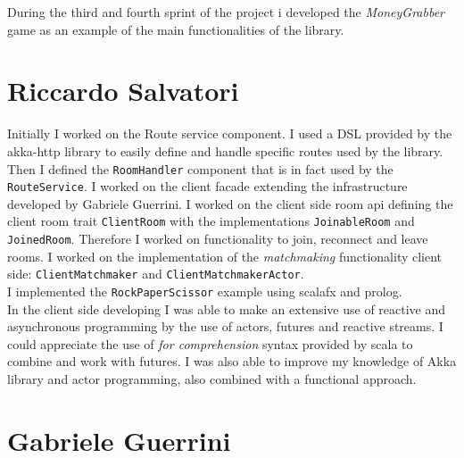 During the third and fourth sprint of the project i developed the \textit{MoneyGrabber} game as an example of the main functionalities of the library. 



\section{Riccardo Salvatori}
Initially I worked on the Route service component. I used a DSL provided by the akka-http library to easily define and handle specific routes used by the library. Then I defined the \texttt{RoomHandler} component that is in fact used by the \texttt{RouteService}.
I worked on the client facade extending the infrastructure developed by Gabriele Guerrini. I worked on the client side room api defining the client room trait \texttt{ClientRoom} with the implementations \texttt{JoinableRoom} and \texttt{JoinedRoom}. Therefore I worked on functionality to join, reconnect and leave rooms.
I worked on the implementation of the \textit{matchmaking} functionality client side: \texttt{ClientMatchmaker} and \texttt{ClientMatchmakerActor}.
\\
I implemented the \texttt{RockPaperScissor} example using scalafx and prolog.
\\
In the client side developing I was able to make an extensive use of reactive and asynchronous programming by the use of actors, futures and reactive streams.
I could appreciate the use of \textit{for comprehension} syntax provided by scala to combine and work with futures.
I was also able to improve my knowledge of Akka library and actor programming, also combined with a functional approach.

\section{Gabriele Guerrini}

